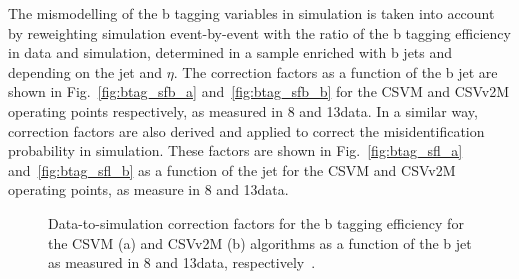 \begin{table}[!htb]
\centering
\caption{Taggers, discriminator threshold for Run 1 and Run 2 and corresponding efficiency for b jets with $\pt > 30\GeV$ in simulated \ttbar events. }
\label{tab:btagwp}
\end{table}

The mismodelling of the b tagging variables in simulation is taken into account by reweighting simulation event-by-event with the ratio of the b tagging efficiency in data and simulation, determined in a sample enriched with b jets and depending on the jet \pt and $\eta$. The correction factors as a function of the b jet \pt  are shown in Fig.~\ref{fig:btag_sfb_a} and~\ref{fig:btag_sfb_b} for the CSVM and CSVv2M operating points respectively, as measured in 8 and 13\TeV data. In a similar way, correction factors are also derived and applied to correct the misidentification probability in simulation. These factors are shown in Fig.~\ref{fig:btag_sfl_a} and~\ref{fig:btag_sfl_b} as a function of the jet \pt for the CSVM and CSVv2M operating points, as measure in 8 and 13\TeV data.

\begin{figure}[!htb]
\begin{center}
\end{center} 
\caption{Data-to-simulation correction factors for the b tagging efficiency for the CSVM (a) and CSVv2M (b) algorithms as a function of the b jet \pt as measured in 8 and 13\TeV data, respectively~\cite{CMS:BTV13001,CMS-PAS-BTV-15-001}.}
\label{fig:btag_sfb}
\end{figure}

